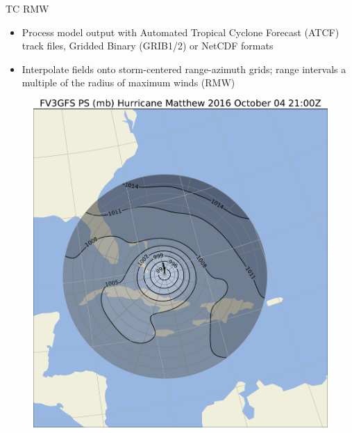 \documentclass[final]{beamer}
\newlength{\onecolwid}
\newlength{\twocolwid}
\begin{document}
\begin{frame}[containsverbatim]
\begin{columns}[t]
\begin{column}{\twocolwid}

\begin{columns}[t,totalwidth=\twocolwid] %

\begin{column}{\onecolwid} %


\begin{block}{TC RMW}

\begin{itemize}
\item Process model output with Automated Tropical Cyclone Forecast
(ATCF) track files, Gridded Binary (GRIB1/2) or NetCDF formats
\item Interpolate fields onto storm-centered range-azimuth grids;
range intervals a multiple of the radius of maximum winds (RMW)
\end{itemize}
\vspace{1in}
\begin{figure}
\includegraphics[width=1.0\linewidth]{../plots/PRMSL_2016100421.pdf}

\end{figure}
\end{block}
\end{column}
\end{columns}
\end{column}
\end{columns}
\end{frame}
\end{document}
